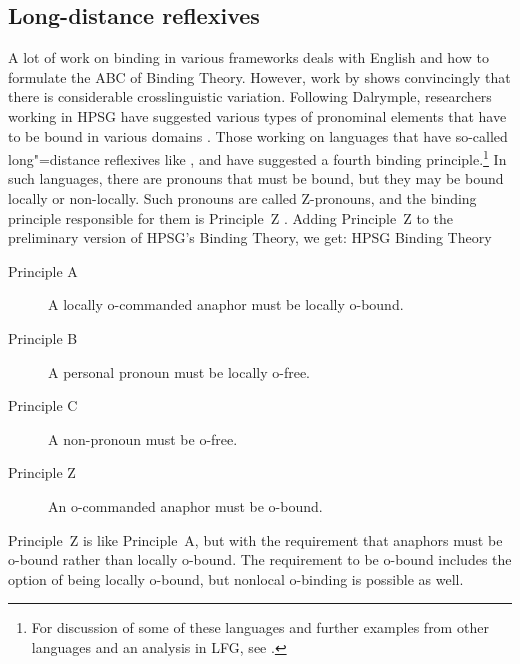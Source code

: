 \documentclass[output=paper,biblatex,babelshorthands,newtxmath,draftmode,colorlinks,citecolor=brown]{langscibook}
\begin{document}
\subsection{Long-distance reflexives}

A lot of work on binding in various frameworks deals with English and how to formulate the ABC of
Binding Theory. However, work by \citet{Dalrymple93a} shows convincingly that there is considerable
crosslinguistic variation. Following Dalrymple, researchers working in HPSG have suggested various types of pronominal
elements that have to be bound in various domains \citep{AGS1998a,Koenig1999b,XPS94a-u,PX98a,BM99a,Hellan2005a}.
Those working on languages that have so-called long"=distance
reflexives\label{page-long-distance-reflexives} like ,
 and 
\citep*{XPS94a-u,PX98a,BM99a,Hellan2005a} have suggested a fourth binding principle.\footnote{
For discussion of some of these languages and further examples from other languages and an analysis
in LFG\indexlfg, see .
} In such languages, there are pronouns that must be bound, but they may be bound locally or non-locally.
Such pronouns are called Z-pronouns, and the binding principle responsible for them is
Principle~Z \citep[]{BM99a}. Adding Principle~Z to the preliminary version of HPSG's
Binding Theory, we get:
\ea
HPSG Binding Theory
\begin{description}
\item [Principle A] A locally o-commanded anaphor must be locally o-bound.
\item [Principle B] A personal pronoun must be locally o-free.
\item [Principle C] A non-pronoun must be o-free.
\item [Principle Z] An o-commanded anaphor must be o-bound.
\end{description}
\z
Principle~Z is like Principle~A, but with the requirement that anaphors must be o-bound rather than
locally o-bound. The requirement to be o-bound includes the option of being locally o-bound, but
nonlocal o-binding is possible as well. 
\end{document}
